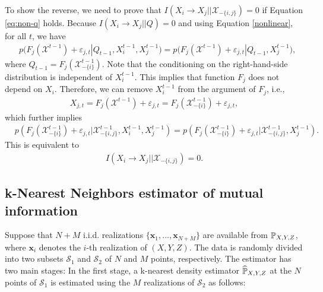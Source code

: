 To show the reverse, we need to prove that $I(X_i\rightarrow X_j||\mathcal{X}_{-\{i,j\}})=0$ if Equation \eqref{eq:non-q} holds.
Because $I(X_i\rightarrow X_j||Q)=0$ and using Equation \eqref{nonlinear}, for all $t$, we have
\begin{align*}
    &p\big(F_{j}(\mathcal{X}^{t-1}) + \varepsilon_{j,t}|Q_{t-1}, X_i^{t-1},X_j^{t-1}\big)=
    p\big(F_{j}(\mathcal{X}^{t-1}) + \varepsilon_{j,t}|Q_{t-1}, X_j^{t-1}\big),
\end{align*}
where $Q_{t-1}=F_{j}(\mathcal{X}_{-\{i\}}^{t-1})$. Note that the conditioning on the right-hand-side distribution is independent of $X_{i}^{t-1}$. This implies that function $F_j$ does not depend on $X_i$. Therefore, we can remove $X_i^{t-1}$ from the argument of $F_j$, i.e., 
\begin{align*}
    X_{j,t}=F_{j}(\mathcal{X}^{t-1})+\varepsilon_{j,t}=F_{j}(\mathcal{X}_{-\{i\}}^{t-1})+\varepsilon_{j,t},
\end{align*} 
which further implies
\begin{align*}
    &p(F_{j}(\mathcal{X}_{-\{i\}}^{t-1}) + \varepsilon_{j,t}|\mathcal{X}_{-\{i,j\}}^{t-1}, X_i^{t-1},X_j^{t-1})=
    p(F_{j}(\mathcal{X}_{-\{i\}}^{t-1}) + \varepsilon_{j,t}|\mathcal{X}_{-\{i,j\}}^{t-1},X_j^{t-1}). 
\end{align*}
This is equivalent to 
\begin{align*}
    I(X_i\rightarrow X_j||\mathcal{X}_{-\{i,j\}})=0.
\end{align*}






\subsection{k-Nearest Neighbors estimator of mutual information}
Suppose that $N+M$ i.i.d. realizations $\{\textbf{x}_1, ..., \textbf{x}_{N+M}\}$ are available from $\operatorname{{\mathbb{P}}}_{X,Y,Z}$, where $\textbf{x}_i$ denotes the $i$-th realization of $(X,Y,Z)$.
The data is randomly divided into two subsets $\mathcal{S}_1$ and $\mathcal{S}_2$ of $N$ and $M$ points, respectively.  
The estimator has two main stages:
In the first stage, a k-nearest density estimator $\widehat{\operatorname{{\mathbb{P}}}}_{X,Y,Z}$ at the $N$ points of $\mathcal{S}_1$ is estimated using the $M$ realizations of $\mathcal{S}_2$ as follows: 

